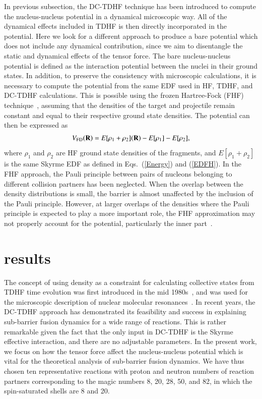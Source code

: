In previous subsection, the DC-TDHF technique has been introduced to compute the nucleus-nucleus potential in a dynamical microscopic way.
All of the dynamical effects included in TDHF is then directly incorporated in the potential. Here we look for a different approach
to produce a bare potential which does not include any dynamical contribution, since we aim to disentangle the static and dynamical effects
of the tensor force. The bare nucleus-nucleus potential is defined as the interaction potential between the nuclei in their ground states.
In addition, to preserve the consistency with microscopic calculations, it is necessary to compute the potential from the same EDF used in
HF, TDHF, and DC-TDHF calculations. This is possible using the frozen Hartree-Fock (FHF) technique~\citep{Simenel2013_PRC88-064604},
assuming that the densities of the target and
projectile remain constant and equal to their respective ground state densities.
The potential can then be expressed as
\begin{align}
\label{eq:FD}
V_\mathrm{FD}(\textbf R)=E[\rho_\mathrm{1}+\rho_\mathrm{2}](\textbf R)-E[\rho_\mathrm{1}]-E[\rho_\mathrm{2}],
\end{align}
where $\rho_\mathrm{1}$ and $\rho_\mathrm{2}$ are HF ground state densities of the fragments, and $E[\rho_\mathrm{1}+\rho_\mathrm{2}]$ is the same
Skyrme EDF as defined in Eqs.~(\ref{Energy}) and (\ref{EDFH}). In the FHF approach, the Pauli principle between pairs of nucleons belonging to different
collision partners has been neglected. When the overlap between the density distributions is small, the barrier is almost unaffected by the inclusion of the Pauli principle.
However, at larger overlaps of the densities where the Pauli principle is expected to play a more important role, the FHF approximation may not properly
account for the potential, particularly the inner part~\citep{Simenel2017_PRC95-031601}.

\section{results}
\label{discuss}

The concept of using density as a constraint for calculating collective states from TDHF time evolution was first introduced in the mid 1980s~\citep{Cusson1985_ZPA320-475}, and was used for the microscopic description of nuclear molecular resonances~\citep{Umar1985_PRC32-172}.
In recent years, the DC-TDHF approach has demonstrated its feasibility and success in explaining sub-barrier fusion dynamics for a wide range of reactions.
This is rather remarkable given the fact that the only input in DC-TDHF is the Skyrme effective interaction, and there are no adjustable parameters.
In the present work, we focus on how the tensor force affect the nucleus-nucleus potential which is vital for the theoretical analysis of sub-barrier fusion dynamics.
We have thus chosen ten representative reactions with proton and neutron numbers of reaction partners corresponding to the magic numbers 8, 20, 28, 50, and 82,
in which the spin-saturated shells are 8 and 20.

